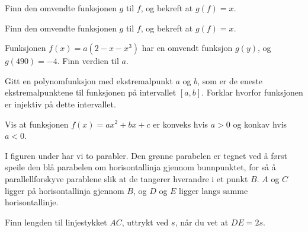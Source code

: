 





\opgt

\nes

\nes

\nes
{}
Finn den omvendte funksjonen $ g $ til $ f $, og bekreft at $ g(f)=x $. \os
{} \os
{}

Finn den omvendte funksjonen $ g $ til $ f $, og bekreft at $ g(f)=x $. \os
{}



Funksjonen $ f(x)=a(2-x-x^3) $ har en omvendt funksjon $ g(y) $, og $ g(490)= -4$. Finn verdien til $ a $.

\nes
{}
Gitt en polynomfunksjon med ekstremalpunkt $ a $ og $ b $, som er de eneste ekstremalpunktene til funksjonen på intervallet $ [a, b] $. Forklar hvorfor funksjonen er injektiv på dette intervallet.

\newpage
{}
Vis at funksjonen $ {f(x)=a x^2+b x + c}  $ er konveks hvis $ {a>0} $ og konkav hvis $ {a<0} $.

I figuren under har vi to parabler. Den grønne parabelen er tegnet ved å først speile den blå parabelen om horisontallinja gjennom bunnpunktet, for så å parallellforskyve parablene slik at de tangerer hverandre i et punkt $ B $. $ A $ og $ C $ ligger på horisontallinja gjennom $ B $, og $ D $ og $ E $ ligger langs samme horisontallinje.\os

Finn lengden til linjestykket $ AC $, uttrykt ved $ s $, når du vet at $ DE=2s $.
